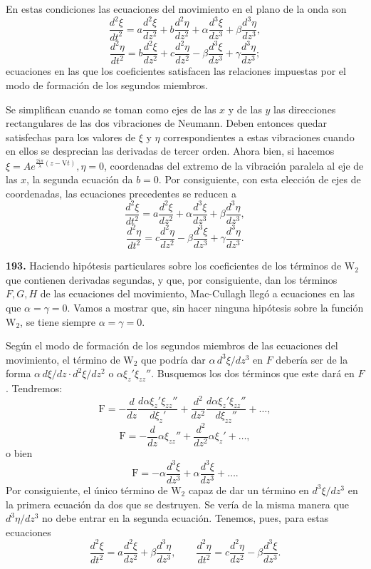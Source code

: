En estas condiciones las ecuaciones del movimiento en el plano de la onda
son
\[
\frac{d^2\xi}{dt^2}=a\frac{d^2\xi}{dz^2}+b\frac{d^2\eta}{dz^2}+\alpha\frac{d^3\xi}{dz^3}+\beta\frac{d^3\eta}{dz^3},
\]
\[
\frac{d^2\eta}{dt^2}=b\frac{d^2\xi}{dz^2}+c\frac{d^2\eta}{dz^2}-\beta\frac{d^3\xi}{dz^3}+\gamma\frac{d^3\eta}{dz^3};
\]
ecuaciones en las que los coeficientes satisfacen las relaciones
impuestas por el modo de formación de los segundos miembros.

Se simplifican cuando se toman como ejes de las
$x$ y de las $y$ las direcciones rectangulares de las dos vibraciones de
Neumann. Deben entonces quedar satisfechas para los valores de $\xi$ y
$\eta$ correspondientes a estas vibraciones cuando en ellos se desprecian
las derivadas de tercer orden. Ahora bien, si hacemos
$\xi=Ae^{\frac{2i\pi}{\lambda}(z-\mathrm Vt)},\eta=0$, coordenadas del
extremo de la vibración paralela al eje de las $x$, la segunda ecuación da
$b=0$. Por consiguiente, con esta elección de ejes de coordenadas, las
ecuaciones precedentes se reducen a
\[
\frac{d^2\xi}{dt^2}=a\frac{d^2\xi}{dz^2}+\alpha\frac{d^3\xi}{dz^3}+\beta\frac{d^3\eta}{dz^3},
\]
\[
\frac{d^2\eta}{dt^2}=c\frac{d^2\eta}{dz^2}-\beta\frac{d^3\xi}{dz^3}+\gamma\frac{d^3\eta}{dz^3}.
\]

\noindent\textbf{193.} Haciendo hipótesis
particulares sobre los coeficientes de los términos de $\mathrm{W}_2$ que
contienen derivadas segundas, y que, por consiguiente, dan los términos
$F,G,H$ de las ecuaciones del movimiento, Mac-Cullagh llegó a ecuaciones
en las que $\alpha=\gamma=0$. Vamos a mostrar que, sin hacer ninguna
hipótesis sobre la función $\mathrm{W}_2$, se tiene siempre $\alpha=\gamma=0$.

Según el modo de formación de los segundos miembros de las ecuaciones del
movimiento, el término de $\mathrm{W}_2$ que podría dar
$\alpha\,d^3\xi/dz^3$ en $F$ debería ser de la forma
$\alpha\,d\xi/dz\cdot d^2\xi/dz^2$ o $\alpha\xi_z'\xi_{zz}''$. Busquemos
los dos términos que este dará en $F$. Tendremos:
\[
\mathrm F=-\frac{d}{dz}\frac{d\alpha\xi_z'\xi_{zz}''}{d\xi_z'}
+\frac{d^2}{dz^2}\frac{d\alpha\xi_z'\xi_{zz}''}{d\xi_{zz}''}+\dots,
\]
\[
\mathrm F=-\frac{d}{dz}\alpha\xi_{zz}''+\frac{d^2}{dz^2}\alpha\xi_z'+\dots,
\]
o bien
\[
\mathrm F=-\alpha\frac{d^3\xi}{dz^3}+\alpha\frac{d^3\xi}{dz^3}+\dots.
\]
Por consiguiente, el único término de $\mathrm{W}_2$ capaz de dar un término en
$d^3\xi/dz^3$ en la primera ecuación da dos que se destruyen. Se vería de
la misma manera que $d^3\eta/dz^3$ no debe entrar en la segunda ecuación.
Tenemos, pues, para estas ecuaciones
\begin{equation}
\frac{d^2\xi}{dt^2}=a\frac{d^2\xi}{dz^2}+\beta\frac{d^3\eta}{dz^3},\qquad
\frac{d^2\eta}{dt^2}=c\frac{d^2\eta}{dz^2}-\beta\frac{d^3\xi}{dz^3}.
\tag{1}
\end{equation}

